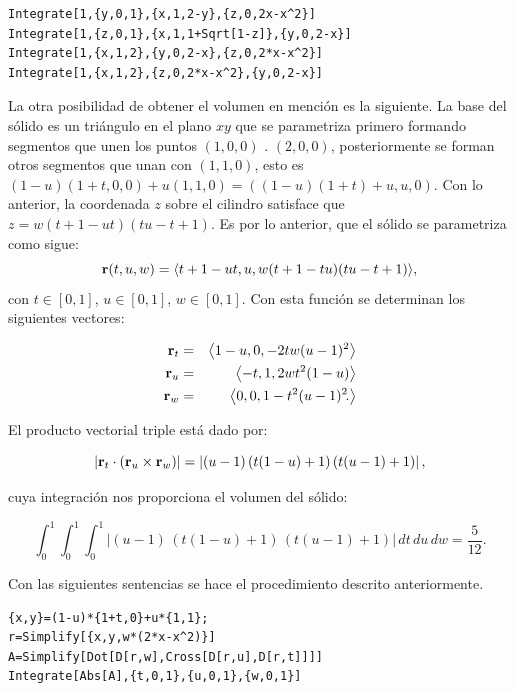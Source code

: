 \begin{tcolorbox}[title=\bf Instrucción en \verb"Mathematica"]\begin{Verbatim}[formatcom=\letraverbatim]
Integrate[1,{y,0,1},{x,1,2-y},{z,0,2x-x^2}]
Integrate[1,{z,0,1},{x,1,1+Sqrt[1-z]},{y,0,2-x}]
Integrate[1,{x,1,2},{y,0,2-x},{z,0,2*x-x^2}]
Integrate[1,{x,1,2},{z,0,2*x-x^2},{y,0,2-x}]
\end{Verbatim}
\end{tcolorbox}

La otra posibilidad de obtener el volumen en mención es la siguiente.
La base del sólido es un triángulo en el plano $xy$ que se parametriza primero formando segmentos que unen los puntos $(1,0,0) $ .
$\left(2,0,0\right)$, posteriormente se forman otros segmentos que unan con $\left( 1,1,0\right) $,
esto es $(1-u)(1+t,0,0)+u(1,1,0)= ((1-u)(1+t)+u,u,0)$.
Con lo anterior, la coordenada $z$ sobre el cilindro satisface que $z=w (t+1-ut)(tu-t+1)$.
Es por lo anterior, que el sólido se parametriza como sigue:
%
\[{\bf r}(t,u,w) =\left\langle t+1-ut,u,w(t+1-tu)(tu-t+1)\right\rangle\!,\]
con $t\in [0,1]$, $u\in [0,1]$, $w\in [0,1]$. Con esta función se determinan los siguientes vectores:

\begin{eqnarray*}
{\bf r}_{t}&=& \left\langle 1-u,0,-2tw(u-1)^2\right\rangle \\
{\bf r}_{u}&=&\left\langle -t,1,2wt^2(1-u) \right\rangle \\
{\bf r}_{w}&=& \left\langle 0,0,1-t^2(u-1)^2\!.\right\rangle
\end{eqnarray*}

El producto vectorial triple está dado por:

\[
\left| {\bf r}_{t}\cdot \left( {\bf r}_{u}\times {\bf r}_{w}\right) \right| =
\left| (u-1)\, (t (1-u)+1)\, (t (u-1)+1) \right|,
\]

cuya integración nos proporciona el volumen del sólido:

\[
\int_{0}^{1} \int_{0}^{1} \int_{0}^{1}
\left| (u-1)\, (t (1-u)+1)\, (t (u-1)+1) \right|
\, dt\, du\, dw = \frac{5}{12}.
\]


Con las siguientes sentencias se hace el procedimiento descrito anteriormente.

\begin{tcolorbox}[title=\bf Instrucción en \verb"Mathematica"]\begin{Verbatim}[formatcom=\letraverbatim]
{x,y}=(1-u)*{1+t,0}+u*{1,1};
r=Simplify[{x,y,w*(2*x-x^2)}]
A=Simplify[Dot[D[r,w],Cross[D[r,u],D[r,t]]]]
Integrate[Abs[A],{t,0,1},{u,0,1},{w,0,1}]
\end{Verbatim}
\end{tcolorbox}

